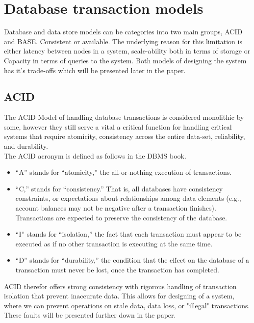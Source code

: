 \documentclass[a4paper,10pt,titlepage]{report}
\begin{document}
\newpage
\section{Database transaction models}

Database and data store models can be categories into two main groups, ACID and BASE. Consistent or available. The underlying reason for this limitation is either latency between nodes in a system, scale-ability both in terms of storage or Capacity in terms of queries to the system. Both models of designing the system has it's trade-offs which will be presented later in the paper.
\subsection{ACID}

The ACID Model of handling database transactions is considered monolithic by some, however they still serve a vital a critical function for handling critical systems that require atomicity, consistency across the entire data-set, reliability, and durability.\\
\vspace{5mm}
The ACID acronym is defined as follows in the DBMS book\cite{DBMSbook}.

\begin{itemize}
    \item “A” stands for “atomicity,” the all-or-nothing execution of transactions.
    \item “C,” stands for “consistency.” That is, all databases
have consistency constraints, or expectations about relationships among
data elements (e.g., account balances may not be negative after a transaction finishes). Transactions are expected to preserve the consistency of
the database.
\item “I” stands for “isolation,” the fact that each transaction must appear
to be executed as if no other transaction is executing at the same
time.
\item “D” stands for “durability,” the condition that the effect on the
database of a transaction must never be lost, once the transaction
has completed.
\end{itemize}

ACID therefor offers strong consistency with rigorous handling of transaction isolation that prevent inaccurate data. This allows for designing of a system, where we can prevent operations on stale data, data loss, or "illegal" transactions. These faults will be presented further down in the paper.
\end{document}
